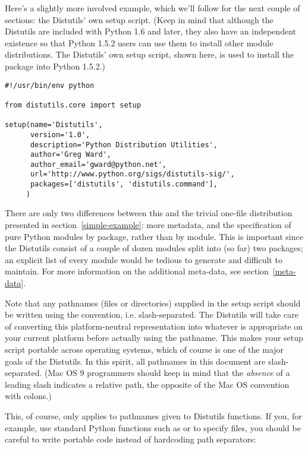 \documentclass{manual}
\begin{document}
Here's a slightly more involved example, which we'll follow for the next
couple of sections: the Distutils' own setup script.  (Keep in mind that
although the Distutils are included with Python 1.6 and later, they also
have an independent existence so that Python 1.5.2 users can use them to
install other module distributions.  The Distutils' own setup script,
shown here, is used to install the package into Python 1.5.2.)

\begin{verbatim}
#!/usr/bin/env python

from distutils.core import setup

setup(name='Distutils',
      version='1.0',
      description='Python Distribution Utilities',
      author='Greg Ward',
      author_email='gward@python.net',
      url='http://www.python.org/sigs/distutils-sig/',
      packages=['distutils', 'distutils.command'],
     )
\end{verbatim}

There are only two differences between this and the trivial one-file
distribution presented in section~\ref{simple-example}: more
metadata, and the specification of pure Python modules by package,
rather than by module.  This is important since the Distutils consist of
a couple of dozen modules split into (so far) two packages; an explicit
list of every module would be tedious to generate and difficult to
maintain.  For more information on the additional meta-data, see
section~\ref{meta-data}.

Note that any pathnames (files or directories) supplied in the setup
script should be written using the \UNIX{} convention, i.e.
slash-separated.  The Distutils will take care of converting this
platform-neutral representation into whatever is appropriate on your
current platform before actually using the pathname.  This makes your
setup script portable across operating systems, which of course is one
of the major goals of the Distutils.  In this spirit, all pathnames in
this document are slash-separated.  (Mac OS 9 programmers should keep in
mind that the \emph{absence} of a leading slash indicates a relative
path, the opposite of the Mac OS convention with colons.)

This, of course, only applies to pathnames given to Distutils
functions.  If you, for example, use standard Python functions such as
 or  to specify files, you
should be careful to write portable code instead of hardcoding path
separators:
\end{document}
